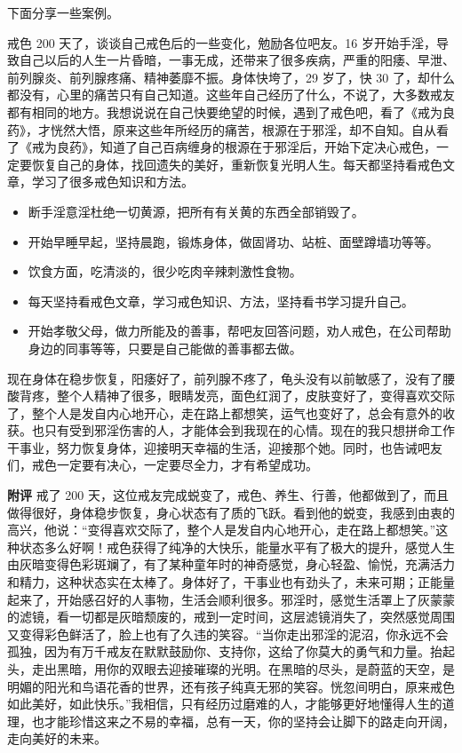 下面分享一些案例。

\begin{case}
    戒色 200 天了，谈谈自己戒色后的一些变化，勉励各位吧友。16 岁开始手淫，导致自己以后的人生一片昏暗，一事无成，还带来了很多疾病，严重的阳痿、早泄、前列腺炎、前列腺疼痛、精神萎靡不振。身体快垮了，29 岁了，快 30 了，却什么都没有，心里的痛苦只有自己知道。这些年自己经历了什么，不说了，大多数戒友都有相同的地方。我想说说在自己快要绝望的时候，遇到了戒色吧，看了《戒为良药》，才恍然大悟，原来这些年所经历的痛苦，根源在于邪淫，却不自知。自从看了《戒为良药》，知道了自己百病缠身的根源在于邪淫后，开始下定决心戒色，一定要恢复自己的身体，找回遗失的美好，重新恢复光明人生。每天都坚持看戒色文章，学习了很多戒色知识和方法。

    \begin{itemize}
        \item 断手淫意淫杜绝一切黄源，把所有有关黄的东西全部销毁了。
        \item 开始早睡早起，坚持晨跑，锻炼身体，做固肾功、站桩、面壁蹲墙功等等。
        \item 饮食方面，吃清淡的，很少吃肉辛辣刺激性食物。
        \item 每天坚持看戒色文章，学习戒色知识、方法，坚持看书学习提升自己。
        \item 开始孝敬父母，做力所能及的善事，帮吧友回答问题，劝人戒色，在公司帮助身边的同事等等，只要是自己能做的善事都去做。
    \end{itemize}

    现在身体在稳步恢复，阳痿好了，前列腺不疼了，龟头没有以前敏感了，没有了腰酸背疼，整个人精神了很多，眼睛发亮，面色红润了，皮肤变好了，变得喜欢交际了，整个人是发自内心地开心，走在路上都想笑，运气也变好了，总会有意外的收获。也只有受到邪淫伤害的人，才能体会到我现在的心情。现在的我只想拼命工作干事业，努力恢复身体，迎接明天幸福的生活，迎接那个她。同时，也告诫吧友们，戒色一定要有决心，一定要尽全力，才有希望成功。

    \textbf{附评} 戒了 200 天，这位戒友完成蜕变了，戒色、养生、行善，他都做到了，而且做得很好，身体稳步恢复，身心状态有了质的飞跃。看到他的蜕变，我感到由衷的高兴，他说：“变得喜欢交际了，整个人是发自内心地开心，走在路上都想笑。”这种状态多么好啊！戒色获得了纯净的大快乐，能量水平有了极大的提升，感觉人生由灰暗变得色彩斑斓了，有了某种童年时的神奇感觉，身心轻盈、愉悦，充满活力和精力，这种状态实在太棒了。身体好了，干事业也有劲头了，未来可期；正能量起来了，开始感召好的人事物，生活会顺利很多。邪淫时，感觉生活罩上了灰蒙蒙的滤镜，看一切都是灰暗颓废的，戒到一定时间，这层滤镜消失了，突然感觉周围又变得彩色鲜活了，脸上也有了久违的笑容。“当你走出邪淫的泥沼，你永远不会孤独，因为有万千戒友在默默鼓励你、支持你，这给了你莫大的勇气和力量。抬起头，走出黑暗，用你的双眼去迎接璀璨的光明。在黑暗的尽头，是蔚蓝的天空，是明媚的阳光和鸟语花香的世界，还有孩子纯真无邪的笑容。恍忽间明白，原来戒色如此美好，如此快乐。”我相信，只有经历过磨难的人，才能够更好地懂得人生的道理，也才能珍惜这来之不易的幸福，总有一天，你的坚持会让脚下的路走向开阔，走向美好的未来。
\end{case}


